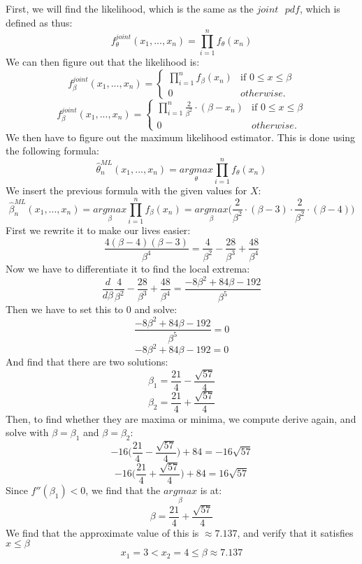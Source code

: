 First, we will find the likelihood, which is the same as the $joint \text{ }pdf$, which is defined as thus:
$$
f_{\theta}^{joint}(x_1,...,x_n) = \prod_{i = 1}^n f_\theta(x_n)
$$
We can then figure out that the likelihood is:
$$
f_{\beta}^{joint}(x_1,...,x_n) = 
\left\{
\begin{matrix}
\prod_{i = 1}^n f_\beta(x_n) & \text{if }0 \leq x \leq \beta \\
0 & otherwise.
\end{matrix}
\right.
$$
$$
f_{\beta}^{joint}(x_1,...,x_n) = 
\left\{
\begin{matrix}
\prod_{i = 1}^n \frac{2}{\beta^2} \cdot (\beta - x_n) & \text{if }0 \leq x \leq \beta \\
0 & otherwise.
\end{matrix}
\right.
$$
We then have to figure out the maximum likelihood estimator. This is done using the following formula:
$$
\hat\theta_n^{ML}(x_1,...,x_n) = \underset{\theta}{argmax}\prod_{i=1}^n f_\theta(x_n)
$$
We insert the previous formula with the given values for $X$:
$$
\hat\beta_n^{ML}(x_1,...,x_n) = \underset{\beta}{argmax}\prod_{i=1}^n f_\beta(x_n) = \underset{\beta}{argmax}\Bigg(\frac{2}{\beta^2} \cdot (\beta - 3) \cdot \frac{2}{\beta^2} \cdot (\beta - 4)\Bigg)
$$
First we rewrite it to make our lives easier:
$$
\frac{4(\beta-4)(\beta-3)}{\beta^4} = \frac{4}{\beta^2}-\frac{28}{\beta^3}+\frac{48}{\beta^4}
$$
Now we have to differentiate it to find the local extrema:
$$
\frac{d}{d\beta} \frac{4}{\beta^2}-\frac{28}{\beta^3}+\frac{48}{\beta^4} = \frac{-8\beta^2+84\beta-192}{\beta^5}
$$
Then we have to set this to $0$ and solve:
$$
\frac{-8\beta^2+84\beta-192}{\beta^5} = 0
$$
$$
-8\beta^2+84\beta-192 = 0
$$
And find that there are two solutions:
$$
\beta_1 = \frac{21}{4}-\frac{\sqrt{57}}{4}
$$
$$
\beta_2 = \frac{21}{4}+\frac{\sqrt{57}}{4}
$$
Then, to find whether they are maxima or minima, we compute derive again, and solve with $\beta = \beta_1$ and $\beta = \beta_2$:
$$
-16\Bigg(\frac{21}{4}-\frac{\sqrt{57}}{4}\Bigg) + 84 = -16\sqrt{57}
$$
$$
-16\Bigg(\frac{21}{4}+\frac{\sqrt{57}}{4}\Bigg) + 84 = 16\sqrt{57}
$$
Since $f''(\beta_1) < 0$, we find that the $\underset{\beta}{argmax}$ is at:
$$
\beta = \frac{21}{4}+\frac{\sqrt{57}}{4}
$$
We find that the approximate value of this is $\approx 7.137$, and verify that it satisfies $x \leq \beta$
$$
x_1 = 3 < x_2 = 4 \leq \beta \approx 7.137
$$